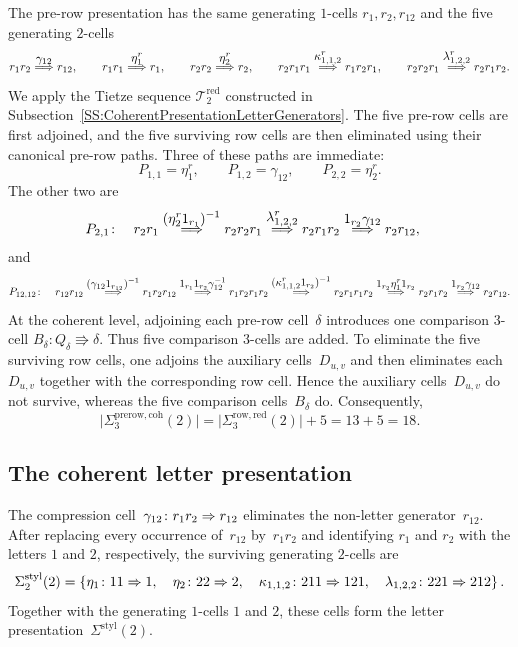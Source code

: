 \documentclass[a4paper, twoside, 11pt, english]{article}
\begin{document}
The pre-row presentation has the same generating $1$-cells
$r_1,r_2,r_{12}$ and the five generating $2$-cells
\[
r_1r_2\overset{\displaystyle \gamma_{12}}{\Longrightarrow}r_{12},
\qquad
r_1r_1\overset{\displaystyle \eta_1^r}{\Longrightarrow}r_1,
\qquad
r_2r_2\overset{\displaystyle \eta_2^r}{\Longrightarrow}r_2,
\qquad
r_2r_1r_1
\overset{\displaystyle \kappa_{1,1,2}^r}{\Longrightarrow}
r_1r_2r_1,
\qquad
r_2r_2r_1
\overset{\displaystyle \lambda_{1,2,2}^r}{\Longrightarrow}
r_2r_1r_2.
\]
We apply the Tietze sequence
$\mathcal T_2^{\mathrm{red}}$ constructed in
Subsection~\ref{SS:CoherentPresentationLetterGenerators}.
The five pre-row cells are first adjoined, and the five surviving row
cells are then eliminated using their canonical pre-row paths. Three
of these paths are immediate:
\[
P_{1,1}=\eta_1^r,
\qquad
P_{1,2}=\gamma_{12},
\qquad
P_{2,2}=\eta_2^r.
\]
The other two are
\[
\begin{aligned}
P_{2,1}\colon\quad
r_2r_1
&\overset{\displaystyle (\eta_2^r1_{r_1})^{-1}}{\Longrightarrow}
r_2r_2r_1
\overset{\displaystyle \lambda_{1,2,2}^r}{\Longrightarrow}
r_2r_1r_2
\overset{\displaystyle 1_{r_2}\gamma_{12}}{\Longrightarrow}
r_2r_{12},
\end{aligned}
\]
and
\[
P_{12,12}\colon\quad
r_{12}r_{12}\overset{\displaystyle (\gamma_{12}1_{r_{12}})^{-1}}{\Longrightarrow}
r_1r_2r_{12}
\overset{\displaystyle 1_{r_1}1_{r_2}\gamma_{12}^{-1}}{\Longrightarrow}
r_1r_2r_1r_2
\overset{\displaystyle (\kappa_{1,1,2}^r1_{r_2})^{-1}}{\Longrightarrow}
r_2r_1r_1r_2
\overset{\displaystyle 1_{r_2}\eta_1^r1_{r_2}}{\Longrightarrow}
r_2r_1r_2
\overset{\displaystyle 1_{r_2}\gamma_{12}}{\Longrightarrow}
r_2r_{12}.
\]
At the coherent level, adjoining each pre-row cell~$\delta$ introduces
one comparison $3$-cell
$B_\delta\colon Q_\delta\Rrightarrow\delta$. Thus five comparison
$3$-cells are added. To eliminate the five surviving row cells, one
adjoins the auxiliary cells~$D_{u,v}$ and then eliminates each
$D_{u,v}$ together with the corresponding row cell. Hence the
auxiliary cells~$D_{u,v}$ do not survive, whereas the five comparison
cells~$B_\delta$ do. Consequently,
\[
\bigl|\Sigma^{\mathrm{prerow,coh}}_3(2)\bigr|
=
\bigl|\Sigma^{\mathrm{row,red}}_3(2)\bigr|+5
=
13+5
=
18.
\]

\subsection{The coherent letter presentation}

The compression cell~$
\gamma_{12}\colon
r_1r_2\Rightarrow r_{12}$
eliminates the non-letter generator~$r_{12}$. After replacing every
occurrence of~$r_{12}$ by~$r_1r_2$ and identifying $r_1$ and $r_2$
with the letters $1$ and $2$, respectively, the surviving generating
$2$-cells are
\[
\Sigma^{\mathrm{styl}}_2(2)
=
\left\{
\eta_1\colon11\Rightarrow1,
\quad
\eta_2\colon22\Rightarrow2,
\quad
\kappa_{1,1,2}\colon211\Rightarrow121,
\quad
\lambda_{1,2,2}\colon221\Rightarrow212
\right\}.
\]
Together with the generating $1$-cells $1$ and $2$, these cells form
the letter presentation~$\Sigma^{\mathrm{styl}}(2)$.
\end{document}
